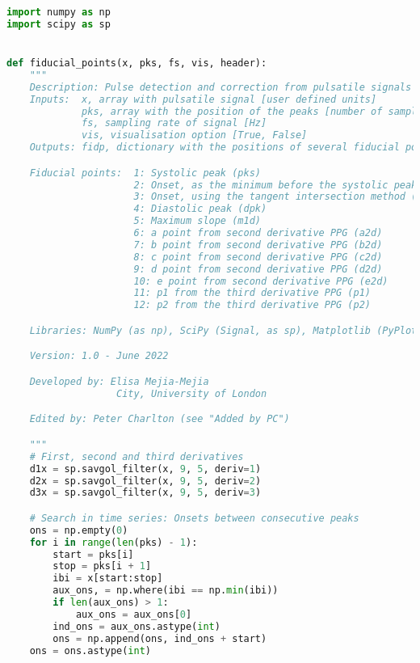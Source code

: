 \begin{lstlisting}[language=Python,label={lst:fidp.py}, basicstyle=\scriptsize]
import numpy as np
import scipy as sp


def fiducial_points(x, pks, fs, vis, header):
    """
    Description: Pulse detection and correction from pulsatile signals
    Inputs:  x, array with pulsatile signal [user defined units]
             pks, array with the position of the peaks [number of samples]
             fs, sampling rate of signal [Hz]
             vis, visualisation option [True, False]
    Outputs: fidp, dictionary with the positions of several fiducial points for the cardiac cycles [number of samples]

    Fiducial points:  1: Systolic peak (pks)
                      2: Onset, as the minimum before the systolic peak (ons)
                      3: Onset, using the tangent intersection method (ti)
                      4: Diastolic peak (dpk)
                      5: Maximum slope (m1d)
                      6: a point from second derivative PPG (a2d)
                      7: b point from second derivative PPG (b2d)
                      8: c point from second derivative PPG (c2d)
                      9: d point from second derivative PPG (d2d)
                      10: e point from second derivative PPG (e2d)
                      11: p1 from the third derivative PPG (p1)
                      12: p2 from the third derivative PPG (p2)

    Libraries: NumPy (as np), SciPy (Signal, as sp), Matplotlib (PyPlot, as plt)

    Version: 1.0 - June 2022

    Developed by: Elisa Mejia-Mejia
                   City, University of London

    Edited by: Peter Charlton (see "Added by PC")

    """
    # First, second and third derivatives
    d1x = sp.savgol_filter(x, 9, 5, deriv=1)
    d2x = sp.savgol_filter(x, 9, 5, deriv=2)
    d3x = sp.savgol_filter(x, 9, 5, deriv=3)

    # Search in time series: Onsets between consecutive peaks
    ons = np.empty(0)
    for i in range(len(pks) - 1):
        start = pks[i]
        stop = pks[i + 1]
        ibi = x[start:stop]
        aux_ons, = np.where(ibi == np.min(ibi))
        if len(aux_ons) > 1:
            aux_ons = aux_ons[0]
        ind_ons = aux_ons.astype(int)
        ons = np.append(ons, ind_ons + start)
    ons = ons.astype(int)


\end{lstlisting}
